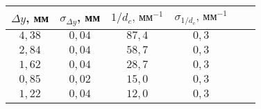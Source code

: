\begin{tabular}{| c | c | c | c | c | c |}
\hline
$\Delta y$, мм & $\sigma_{\Delta y}$, мм & $1/d_c \text{, мм}^{-1}$ & $\sigma_{1/d_c}  \text{, мм}^{-1}$ \\
\hline
$4,38$ & $0,04$ & $87,4$ & $0,3$ \\
\hline
$2,84$ & $0,04$ & $58,7$ & $0,3$ \\
\hline
$1,62$ & $0,04$ & $28,7$ & $0,3$ \\
\hline
$0,85$ & $0,02$ & $15,0$ & $0,3$ \\
\hline
$1,22$ & $0,04$ & $12,0$ & $0,3$ \\
\hline
\end{tabular}
